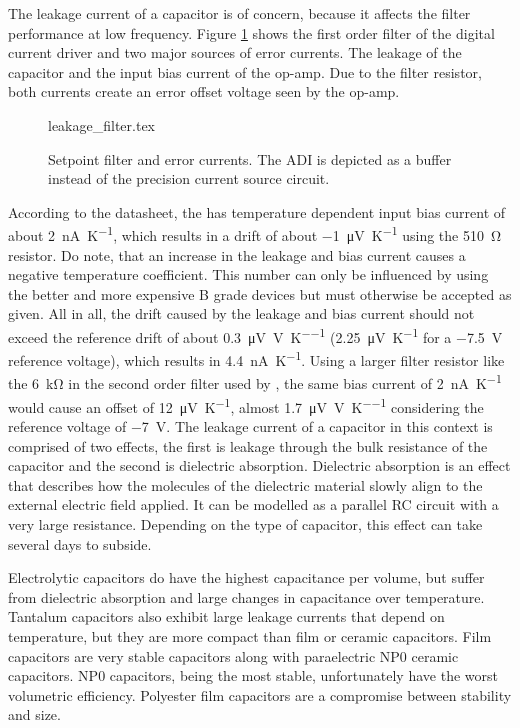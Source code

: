 The leakage current of a capacitor is of concern, because it affects the filter performance at low frequency. Figure \ref{fig:setpoint_filter} shows the first order filter of the digital current driver and two major sources of error currents. The leakage of the capacitor and the input bias current of the op-amp. Due to the filter resistor, both currents create an error offset voltage seen by the op-amp.
\begin{figure}[ht]
    \centering
        {leakage_filter.tex}
    \caption{Setpoint filter and error currents. The ADI  is depicted as a buffer instead of the precision current source circuit.}
    \label{fig:setpoint_filter}
\end{figure}

According to the datasheet, the  \cite{datasheet_AD797} has temperature dependent input bias current of about \qty[retain-explicit-plus]{+2}{\nA \per \kelvin}, which results in a drift of about \qty{-1}{\uV \per \kelvin} using the \qty{510}{\ohm} resistor. Do note, that an increase in the leakage and bias current causes a negative temperature coefficient. This number can only be influenced by using the better and more expensive B grade devices but must otherwise be accepted as given. All in all, the drift caused by the leakage and bias current should not exceed the reference drift of about \qty{0.3}{\uV \per \V \per \kelvin} (\qty{2.25}{\uV \per \kelvin} for a \qty{-7.5}{\V} reference voltage), which results in \qty{4.4}{\nA \per \kelvin}. Using a larger filter resistor like the \qty{6}{\kilo\ohm} in the second order filter used by \citeauthor{libbrecht_hall} \cite{libbrecht_hall}, the same bias current of \qty{2}{\nA \per \kelvin} would cause an offset of \qty{12}{\uV \per \kelvin}, almost \qty{1.7}{\uV \per \V \per \kelvin} considering the reference voltage of \qty{-7}{\V}. \label{sec:dielectric_absorption} The leakage current of a capacitor in this context is comprised of two effects, the first is leakage through the bulk resistance of the capacitor and the second is dielectric absorption. Dielectric absorption is an effect that describes how the molecules of the dielectric material slowly align to the external electric field applied. It can be modelled as a parallel RC circuit with a very large resistance. Depending on the type of capacitor, this effect can take several days to subside.

Electrolytic capacitors do have the highest capacitance per volume, but suffer from dielectric absorption and large changes in capacitance over temperature. Tantalum capacitors also exhibit large leakage currents \cite{tantalum_leakage} that depend on temperature, but they are more compact than film or ceramic capacitors. Film capacitors are very stable capacitors along with paraelectric NP0 ceramic capacitors. NP0 capacitors, being the most stable, unfortunately have the worst volumetric efficiency. Polyester film capacitors are a compromise between stability and size.

